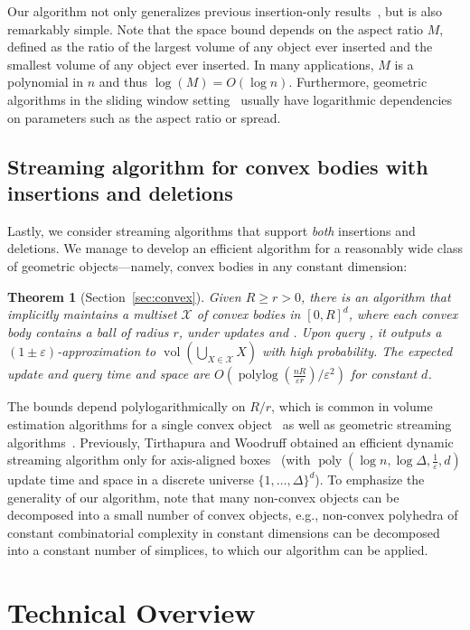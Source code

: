 \documentclass[11pt]{article}
\def\poly{\operatorname{poly}}
\def\polylog{\operatorname{polylog}}
\def\vol{\operatorname{vol}}		%
\newtheorem{theorem}{Theorem}[section]
\newcommand{\eps}{\varepsilon}
\newcommand{\class}[1]{\mathcal{#1}}
\begin{document}
%
Our algorithm not only generalizes previous insertion-only results~\cite{MVC21}, but is also remarkably simple. Note that the space bound depends on the aspect ratio $M$, defined as the ratio of the largest volume of any object ever inserted and the smallest volume of any object ever inserted. In many applications, $M$ is a polynomial in $n$ and thus $\log(M) = O(\log n)$. Furthermore, geometric algorithms in the sliding window setting~\cite{FeigenbaumKZ04,ChanS06} usually have logarithmic dependencies on parameters such as the aspect ratio or spread.
%
\subsection{Streaming algorithm for convex bodies with insertions and deletions}
Lastly, we consider streaming algorithms that support \emph{both} insertions and deletions.
We manage to develop an efficient algorithm for a reasonably wide class of geometric objects---namely, convex bodies in any constant dimension:
%
\begin{theorem}[Section~\ref{sec:convex}]
\label{thm:convexalgo}
Given $R \ge r > 0$, there is an algorithm that implicitly maintains a multiset $\class{X}$ of convex bodies in $[0,R]^d$, where each convex body contains a ball of radius $r$, under updates  and . Upon query \est{}, it outputs a $(1\pm\eps)$-approximation to $\vol\left(\bigcup_{X \in \class{X}} X\right)$ with high probability. The expected update and query time and space are $O(\polylog(\frac{nR}{\eps r}) / \eps^2)$ for constant $d$.
\end{theorem}
%
The bounds depend polylogarithmically on $R/r$, which is common in volume estimation algorithms for a single convex object~\cite{DyerFK91} as well as geometric streaming algorithms~\cite{Indyk04,FrahlingIS08}.
%
Previously, Tirthapura and Woodruff obtained an efficient dynamic streaming algorithm only for axis-aligned boxes~\cite{TW12} (with $\poly(\log n, \log \Delta, \frac{1}{\eps}, d)$ update time and space in a discrete universe $\{1,\ldots,\Delta\}^d$).
To emphasize the generality of our algorithm, note that many non-convex objects can be decomposed into a small number of convex objects, e.g., non-convex polyhedra of constant combinatorial complexity in constant dimensions can be decomposed into a constant number of simplices, to which our algorithm can be  applied.
%
\section{Technical Overview}
%
\end{document}
